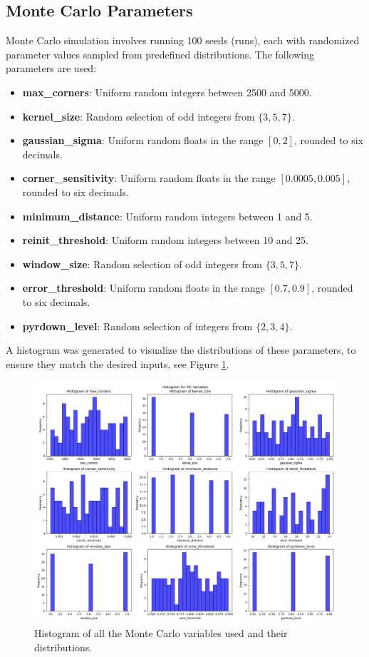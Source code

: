 \documentclass[11pt, conference, letterpaper]{IEEEtran}
\begin{document}
\subsection{Monte Carlo Parameters}

Monte Carlo simulation involves running 100 seeds (runs), each with randomized parameter values sampled from predefined distributions. The following parameters are used:
\begin{itemize}
    \item \textbf{max\_corners}: Uniform random integers between 2500 and 5000.
    \item \textbf{kernel\_size}: Random selection of odd integers from $\{3, 5, 7\}$.
    \item \textbf{gaussian\_sigma}: Uniform random floats in the range $[0, 2]$, rounded to six decimals.
    \item \textbf{corner\_sensitivity}: Uniform random floats in the range $[0.0005, 0.005]$, rounded to six decimals.
    \item \textbf{minimum\_distance}: Uniform random integers between 1 and 5.
    \item \textbf{reinit\_threshold}: Uniform random integers between 10 and 25.
    \item \textbf{window\_size}: Random selection of odd integers from $\{3, 5, 7\}$.
    \item \textbf{error\_threshold}: Uniform random floats in the range $[0.7, 0.9]$, rounded to six decimals.
    \item \textbf{pyrdown\_level}: Random selection of integers from $\{2, 3, 4\}$.
\end{itemize}

A histogram was generated to visualize the distributions of these parameters, to ensure they match the desired inputs, see Figure \ref{fig:mc_hist}.

\begin{figure}[t]
    \centering
    \includegraphics[width=\linewidth]{mc_images/mc_histogram.png}
    \caption{Histogram of all the Monte Carlo variables used and their distributions.}
    \label{fig:mc_hist}
\end{figure}
\end{document}
